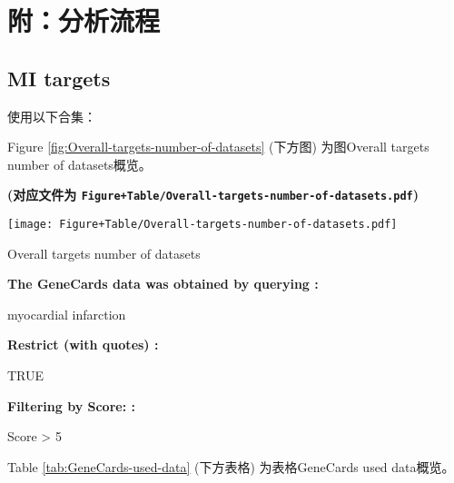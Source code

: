 \documentclass[
]{article}
\begin{document}
\hypertarget{workflow}{%
\section{附：分析流程}\label{workflow}}

\hypertarget{mi-targets}{%
\subsection{MI targets}\label{mi-targets}}

使用以下合集：

Figure \ref{fig:Overall-targets-number-of-datasets} (下方图) 为图Overall targets number of datasets概览。

\textbf{(对应文件为 \texttt{Figure+Table/Overall-targets-number-of-datasets.pdf})}

\def\@captype{figure}
\begin{center}
\texttt{[image: Figure+Table/Overall-targets-number-of-datasets.pdf]}
\caption{Overall targets number of datasets}\label{fig:Overall-targets-number-of-datasets}
\end{center}

\begin{center}\begin{tcolorbox}[colback=gray!10, colframe=gray!50, width=0.9\linewidth, arc=1mm, boxrule=0.5pt]
\textbf{
The GeneCards data was obtained by querying
:}

\vspace{0.5em}

    myocardial infarction

\vspace{2em}


\textbf{
Restrict (with quotes)
:}

\vspace{0.5em}

    TRUE

\vspace{2em}


\textbf{
Filtering by Score:
:}

\vspace{0.5em}

    Score > 5

\vspace{2em}
\end{tcolorbox}
\end{center}

Table \ref{tab:GeneCards-used-data} (下方表格) 为表格GeneCards used data概览。
\end{document}
